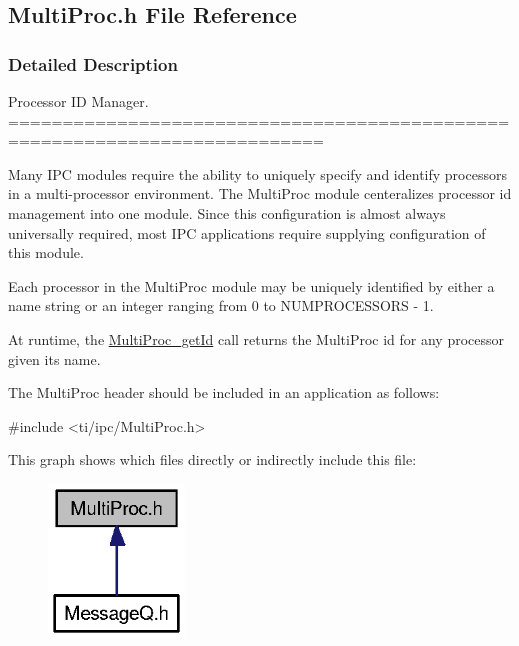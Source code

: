 \subsection{Multi\-Proc.\-h File Reference}
\label{_multi_proc_8h}


\subsubsection{Detailed Description}
Processor I\-D Manager. ===========================================================================

Many I\-P\-C modules require the ability to uniquely specify and identify processors in a multi-\/processor environment. The Multi\-Proc module centeralizes processor id management into one module. Since this configuration is almost always universally required, most I\-P\-C applications require supplying configuration of this module.

Each processor in the Multi\-Proc module may be uniquely identified by either a name string or an integer ranging from 0 to N\-U\-M\-P\-R\-O\-C\-E\-S\-S\-O\-R\-S -\/ 1.

At runtime, the \hyperlink{_multi_proc_8h_ad690d4b42978e95cb57d9244bb8e6959}{Multi\-Proc\-\_\-get\-Id} call returns the Multi\-Proc id for any processor given its name.

The Multi\-Proc header should be included in an application as follows\-: 
\begin{DoxyCode}
\textcolor{preprocessor}{    #include <ti/ipc/MultiProc.h>}
\end{DoxyCode}
 This graph shows which files directly or indirectly include this file\-:
\nopagebreak
\begin{figure}[H]
\begin{center}
\leavevmode
\includegraphics[width=103pt]{_multi_proc_8h__dep__incl}
\end{center}
\end{figure}
